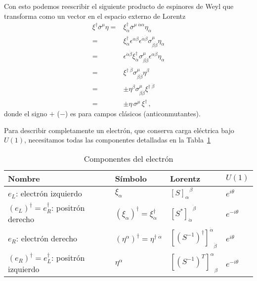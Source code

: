 Con esto podemos reescribir el siguiente producto de espinores  de Weyl que transforma como un vector en el espacio externo de Lorentz
\begin{align}
\label{eq:exxe}
  \xi^{\dagger}\overline{\sigma}^{\mu}\eta=& \xi^{\dagger}_{\dot{\alpha}}\overline{\sigma}^{\mu\;\dot{\alpha}\alpha}\eta_{\alpha}\nonumber\\
=&\xi^{\dagger}_{\dot{\alpha}}\epsilon^{\alpha\beta}\epsilon^{\dot{\alpha}\dot{\beta}}{\sigma}^{\mu}_{\beta\dot{\beta}} \eta_{\alpha}\nonumber\\
  =&\epsilon^{\dot{\alpha}\dot{\beta}}\xi^{\dagger}_{\dot{\alpha}}{\sigma}^{\mu}_{\beta\dot{\beta}} \epsilon^{\alpha\beta}\eta_{\alpha}\nonumber\\
  =&\xi^{\dagger\;\dot{\beta}}{\sigma}^{\mu}_{\beta\dot{\beta}} \eta^{\beta}\nonumber\\
  =&\pm\eta^{\beta}{\sigma}^{\mu}_{\beta\dot{\beta}}\xi^{\dagger\;\dot{\beta}} \nonumber\\
  =&\pm\eta\,{\sigma}^{\mu}\,\xi^{\dagger} \,,
\end{align}
donde el signo $+$ ($-$) es para campos clásicos (anticonmutantes).
\begin{frame}
Para describir completamente un electrón, que conserva carga eléctrica bajo $U(1)$, necesitamos todas las componentes detalladas en la Tabla~\ref{tab:electron}
\begin{table}
  \centering
  \begin{tabular}{llll}
    Nombre & Símbolo & Lorentz & $U(1)$\\\hline
    $e_L$: electrón izquierdo & $\xi_{\alpha}$ & ${\left[ S \right]_{\alpha}}^{\beta}$ & $e^{i\theta}$\\
   $\left( e_L \right)^{\dagger}=e^{\dagger}_R$: positrón derecho   & $\left( \xi_{\alpha} \right)^{\dagger}=\xi^{\dagger}_{\dot{\alpha}}$ & ${\left[{S^{*}}\right]_{\dot{\alpha}}}^{\dot{\beta}}$ & $e^{-i\theta}$\\
   $e_R$: electrón derecho   & $\left( \eta^{\alpha} \right)^{\dagger}=\eta^{\dagger\;\dot{\alpha}}$ & ${\left[ \left( S^{-1} \right)^\dagger \right]^{\dot{\alpha}}}_{\dot{\beta}}$& $e^{i\theta}$\\
   $\left( e_R \right)^{\dagger}=e^{\dagger}_L$: positrón izquierdo&$\eta^{\alpha}$& ${\left[ \left( S^{-1} \right)^T \right]^{\alpha}}_{\beta}$ & $e^{-i\theta}$\\\hline
  \end{tabular}
  \caption{Componentes del electrón}
  \label{tab:electron}
\end{table}

\end{frame}
